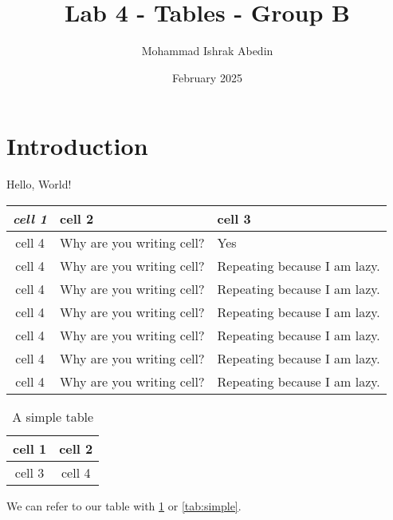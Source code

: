 \documentclass[12pt, a4paper]{article}
\title{Lab 4 - Tables - Group B}
\author{Mohammad Ishrak Abedin}
\date{February 2025}
\begin{document}
\maketitle

\section{Introduction}

\listoftables

Hello, World!

\begin{center}
    \begin{tabular}{| c || l | C{0.4\textwidth} |}
        \hline
       \textit{cell 1}  & \textbf{cell 2} & \textbf{cell 3}  \\
       \hline \hline
       cell 4  & Why are you writing cell? & Yes \\ 
       \hline
       cell 4  & Why are you writing cell? & Repeating because I am lazy.\\
       \hline
       cell 4  & Why are you writing cell? & Repeating because I am lazy. \\
       \hline
       cell 4  & Why are you writing cell? & Repeating because I am lazy. \\
       \hline
       cell 4  & Why are you writing cell? & Repeating because I am lazy. \\
       \hline
       cell 4  & Why are you writing cell? & Repeating because I am lazy. \\
       \hline
       cell 4  & Why are you writing cell? & Repeating because I am lazy. \\
       \hline
    \end{tabular}
\end{center}


\kant[1]

\begin{table}[htbp]
    \centering
    \caption{A simple table}
    \begin{tabular}{|c|c|}
        \hline
        cell 1 & cell 2 \\
        \hline
        cell 3 & cell 4 \\ 
        \hline
    \end{tabular}
    \label{tab:simple}
\end{table}

We can refer to our table with \ref{tab:simple} or \autoref{tab:simple}. \kant[2]
\end{document}
